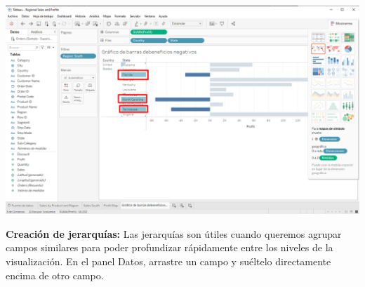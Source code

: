 \documentclass[12pt,letterpaper]{article}
\begin{document}
\begin{enumerate}
        \begin{center}
            \includegraphics[width=15cm]{./img/img45.png}
        \end{center}
    \end{enumerate}
    \textbf{Creación de jerarquías:} Las jerarquías son útiles cuando queremos agrupar campos similares para poder profundizar rápidamente entre los niveles de la visualización. En el panel Datos, arrastre un campo y suéltelo directamente encima de otro campo.
\end{document}
